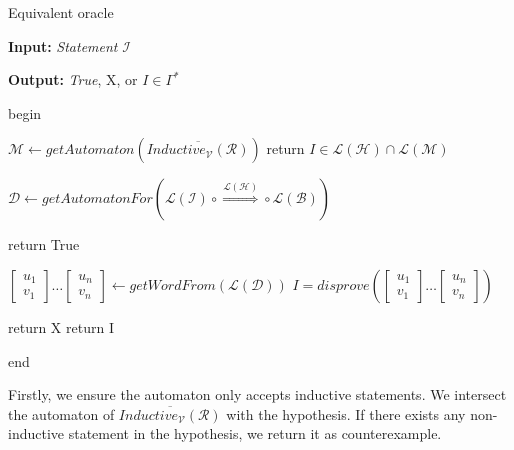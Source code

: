 \begin{algorithm}
    \caption{Equivalent oracle}\label{alg:equivalence}
    \textbf{Input: } \textit{Statement} $\mathcal{I}$ 

    \textbf{Output: } \textit{True}, X, or $I \in \Gamma^*$
    
    begin
    \begin{algorithmic}[1]
        \State $\mathcal{M} \gets getAutomaton(\overline{Inductive_{\mathcal{V}}(\mathcal{R})})$
         
            \State return $I \in \mathcal{L}(\mathcal{H}) \cap \mathcal{L}(\mathcal{M})$
        \EndIf

        \State $\mathcal{D} \leftarrow getAutomatonFor(\mathcal{L}(\mathcal{I}) \circ \overset{\mathcal{L}(\mathcal{H})}{\Rightarrow} \circ \mathcal{L}(\mathcal{B})) $

            \State return True
        \EndIf

        \State $[\substack{u_1 \\ v_1}] \dots [\substack{u_n \\ v_n}] \leftarrow getWordFrom(\mathcal{L}(\mathcal{D}))$
        \State $I = disprove([\substack{u_1 \\ v_1}] \dots [\substack{u_n \\ v_n}])$
        
            \State return X 
        \EndIf
        \State return I
    \end{algorithmic}
    end
\end{algorithm}

Firstly, we ensure the automaton only accepts 
inductive statements. 
We intersect the automaton of $\overline{Inductive_{\mathcal{V}}(\mathcal{R})}$ with the hypothesis.
If there exists any non-inductive statement in the hypothesis,
we return it as counterexample.

